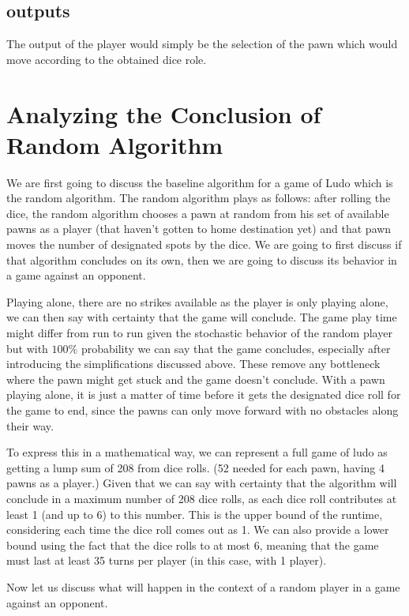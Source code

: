 \documentclass{article} %
\begin{document}
\subsection{outputs}
The output of the player would simply be the selection of the pawn which would move according to the obtained dice role.

\section{Analyzing the Conclusion of Random Algorithm }
We are first going to discuss the baseline algorithm for a game of Ludo which is the random algorithm. The random algorithm plays as follows: after rolling the dice, the random algorithm chooses a pawn at random from his set of available pawns as a player (that haven’t gotten to home destination yet) and that pawn moves the number of designated spots by the dice. We are going to first discuss if that algorithm concludes on its own, then we are going to discuss its behavior in a game against an opponent. 

Playing alone, there are no strikes available as the player is only playing alone, we can then say with certainty that the game will conclude. The game play time might differ from run to run given the stochastic behavior of the random player but with $100\%$ probability we can say that the game concludes, especially after introducing the simplifications discussed above. These remove any bottleneck where the pawn might get stuck and the game doesn’t conclude. With a pawn playing alone, it is just a matter of time before it gets the designated dice roll for the game to end, since the pawns can only move forward with no obstacles along their way.

To express this in a mathematical way, we can represent a full game of ludo as getting a lump sum of 208 from dice rolls. (52 needed for each pawn, having 4 pawns as a player.) Given that we can say with certainty that the algorithm will conclude in a maximum number of 208 dice rolls, as each dice roll contributes at least 1 (and up to 6) to this number. This is the upper bound of the runtime, considering each time the dice roll comes out as 1. We can also provide a lower bound using the fact that the dice rolls to at most 6, meaning that the game must last at least 35 turns per player (in this case, with 1 player).

Now let us discuss what will happen in the context of a random player in a game against an opponent. 
\end{document}
